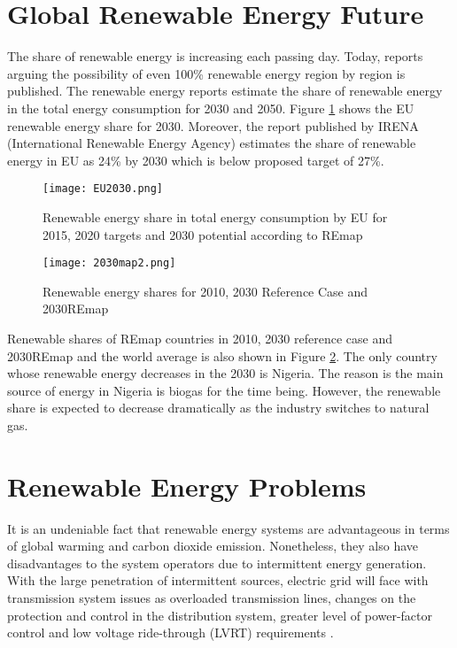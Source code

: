 \section{Global Renewable Energy Future}
The share of renewable energy is increasing each passing day. Today, reports arguing the possibility of even 100\% renewable energy region by region is published\cite{REN212017d}. The renewable energy reports estimate the share of renewable energy in the total energy consumption for 2030 and 2050. Figure \ref{EU2030} shows the EU renewable energy share for 2030. Moreover, the report published by IRENA (International Renewable Energy Agency) estimates the share of renewable energy in EU as 24\% by 2030 which is below proposed target of 27\%\cite{IRENA2014}.
\begin{figure}[h!]
	\centering
	\texttt{[image: EU2030.png]}
	\caption{Renewable energy share in total energy consumption by EU for 2015, 2020 targets and 2030 potential according to REmap \cite{EuropeanCommission2018}}
	\label{EU2030}
\end{figure}


\begin{figure}[h!]
	\centering
	\texttt{[image: 2030map2.png]}
	\caption{Renewable energy shares for 2010, 2030 Reference Case and 2030REmap \cite{IRENA2014}}
	\label{2030map}
\end{figure}
Renewable shares of REmap countries in 2010, 2030 reference case and 2030REmap and the world average is also shown in Figure \ref{2030map}. The only country whose renewable energy decreases in the 2030 is Nigeria. The reason is the main source of energy in Nigeria is biogas for the time being. However, the renewable share is expected to decrease dramatically as the industry switches to natural gas.

\section{Renewable Energy Problems}
It is an undeniable fact that renewable energy systems are advantageous in terms of global warming and carbon dioxide emission. Nonetheless, they also have disadvantages to the system operators due to intermittent energy generation. With the large penetration of intermittent sources, electric grid will face with transmission system issues as overloaded transmission lines, changes on the protection and control in the distribution system, greater level of power-factor control and low voltage ride-through (LVRT) requirements \cite{Ipakchi2009}.\\

